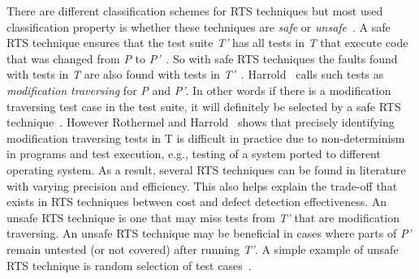 \documentclass[11pt, oneside]{article}   	%
\begin{document}
There are different classification schemes for RTS techniques but most used classification property is whether these techniques are \textit{safe} or \textit{unsafe}~\cite{Emelie10}. A safe RTS technique ensures that the test suite \textit{T'} has all tests in \textit{T} that execute code that was changed from \textit{P} to \textit{P'}~\cite{Harrold99}. So with safe RTS techniques the faults found with tests in \textit{T} are also found with tests in \textit{T'}~\cite{Emelie10}. Harrold~\cite{Harrold99} calls such tests as \textit{modification traversing} for \textit{P} and \textit{P'}.  In other words if there is a modification traversing test case in the test suite, it will definitely be selected by a safe RTS technique~\cite{Yoo12}. However Rothermel and Harrold~\cite{Rothermel96} shows that precisely identifying modification traversing tests in T is difficult in practice due to non-determinism in programs and test execution, e.g., testing of a system ported to different operating system. As a result, several RTS techniques can be found in literature with varying precision and efficiency. This also helps explain the trade-off that exists in RTS techniques between cost and defect detection effectiveness. An unsafe RTS technique is one that may miss tests from \textit{T'} that are modification traversing. An unsafe RTS technique may be beneficial in cases where parts of \textit{P'} remain untested (or not covered) after running \textit{T'}. A simple example of unsafe RTS technique is random selection of test cases~\cite{Emelie10}. 




\end{document}
